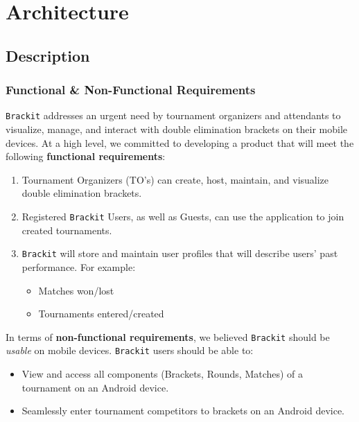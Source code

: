 \documentclass{article}
\begin{document}
\clearpage
\section{Architecture}
\subsection{Description}
\subsubsection{Functional \& Non-Functional Requirements}
\texttt{Brackit} addresses an urgent need by tournament organizers and attendants to visualize, manage, and interact with double elimination
brackets on their mobile devices. At a high level, we committed to developing a product that will meet the following \textbf{functional requirements}:
\begin{enumerate}
    \item{Tournament Organizers (TO's) can create, host, maintain, and visualize double elimination brackets.}
    \item{Registered \texttt{Brackit} Users, as well as Guests, can use the application to join created tournaments.}
    \item{\texttt{Brackit} will store and maintain user profiles that will describe users' past performance. For example:
    \begin{itemize}
        \item{Matches won/lost}
        \item{Tournaments entered/created}
    \end{itemize}
    }
\end{enumerate}
In terms of \textbf{non-functional requirements}, we believed \texttt{Brackit} should be \textit{usable} on mobile devices. \texttt{Brackit} users should be able to:
\begin{itemize}
    \item{View and access all components (Brackets, Rounds, Matches) of a tournament on an Android device.}
    \item{Seamlessly enter tournament competitors to brackets on an Android device.}
\end{itemize}
\end{document}
